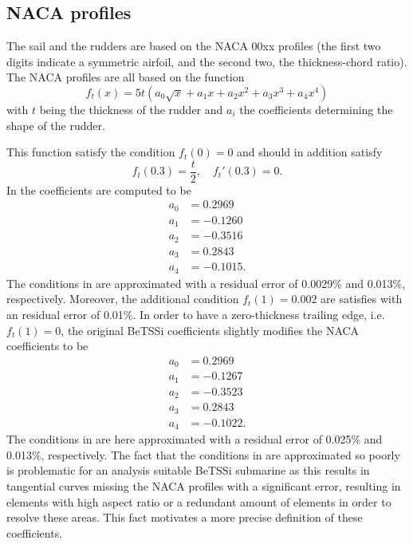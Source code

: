 \subsection{NACA profiles}
The sail and the rudders are based on the NACA 00xx profiles \cite{Ladson1996cpt,Cummings2015gfa} (the first two digits indicate a symmetric airfoil, and the second two, the thickness-chord ratio). The NACA profiles are all based on the function
\begin{equation}\label{Eq3:NACA}
	f_t(x) = 5t\left(a_0\sqrt{x} + a_1x +a_2x^2+a_3x^3+a_4x^4\right)
\end{equation}
with $t$ being the thickness of the rudder and $a_i$ the coefficients determining the shape of the rudder.

This function satisfy the condition $f_t(0)=0$ and should in addition satisfy
\begin{equation}\label{Eq3:NACAmainConditions}
	f_t(0.3) = \frac{t}{2}, \quad f_t'(0.3) = 0.
\end{equation}
In \cite{Ladson1996cpt,Cummings2015gfa} the coefficients are computed to be
\begin{align*}
	a_0 &= 0.2969\\
	a_1 &=-0.1260\\
	a_2 &=-0.3516\\
	a_3 &= 0.2843\\
	a_4 &=-0.1015.
\end{align*}
The conditions in  are approximated with a residual error of 0.0029\% and 0.013\%, respectively. Moreover, the additional condition $f_t(1) = 0.002$ are satisfies with an  residual error of 0.01\%. In order to have a zero-thickness trailing edge, i.e. $f_t(1)=0$, the original BeTSSi coefficients slightly modifies the NACA coefficients to be
\begin{align*}
	a_0 &= 0.2969\\
	a_1 &=-0.1267\\
	a_2 &=-0.3523\\
	a_3 &= 0.2843\\
	a_4 &=-0.1022.
\end{align*}
The conditions in  are here approximated with a residual error of 0.025\% and 0.013\%, respectively. The fact that the conditions in  are approximated so poorly is problematic for an analysis suitable BeTSSi submarine as this results in tangential curves missing the NACA profiles with a significant error, resulting in elements with high aspect ratio or a redundant amount of elements in order to resolve these areas. This fact motivates a more precise definition of these coefficients.

